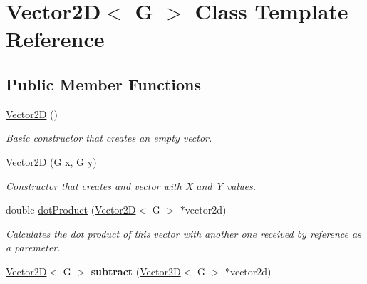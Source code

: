 \hypertarget{class_vector2_d}{}\section{Vector2\+D$<$ G $>$ Class Template Reference}
\label{class_vector2_d}
\subsection*{Public Member Functions}
\begin{DoxyCompactItemize}
\item 
\hypertarget{class_vector2_d_a3bce991141a2cfd9c381651c06d2bee5}{}\hyperlink{class_vector2_d_a3bce991141a2cfd9c381651c06d2bee5}{Vector2\+D} ()\label{class_vector2_d_a3bce991141a2cfd9c381651c06d2bee5}

\begin{DoxyCompactList}\small\item\em Basic constructor that creates an empty vector. \end{DoxyCompactList}\item 
\hypertarget{class_vector2_d_a25ac574bd1a4deb41a9b198afd5f2787}{}\hyperlink{class_vector2_d_a25ac574bd1a4deb41a9b198afd5f2787}{Vector2\+D} (G x, G y)\label{class_vector2_d_a25ac574bd1a4deb41a9b198afd5f2787}

\begin{DoxyCompactList}\small\item\em Constructor that creates and vector with X and Y values. \end{DoxyCompactList}\item 
\hypertarget{class_vector2_d_abbf351182e5d3e725a0b75e82435b846}{}double \hyperlink{class_vector2_d_abbf351182e5d3e725a0b75e82435b846}{dot\+Product} (\hyperlink{class_vector2_d}{Vector2\+D}$<$ G $>$ $\ast$vector2d)\label{class_vector2_d_abbf351182e5d3e725a0b75e82435b846}

\begin{DoxyCompactList}\small\item\em Calculates the dot product of this vector with another one received by reference as a paremeter. \end{DoxyCompactList}\item 
\hypertarget{class_vector2_d_acbe06ed3f1f2360d4826f3914a299aeb}{}\hyperlink{class_vector2_d}{Vector2\+D}$<$ G $>$ {\bfseries subtract} (\hyperlink{class_vector2_d}{Vector2\+D}$<$ G $>$ $\ast$vector2d)\label{class_vector2_d_acbe06ed3f1f2360d4826f3914a299aeb}


\end{DoxyCompactItemize}
